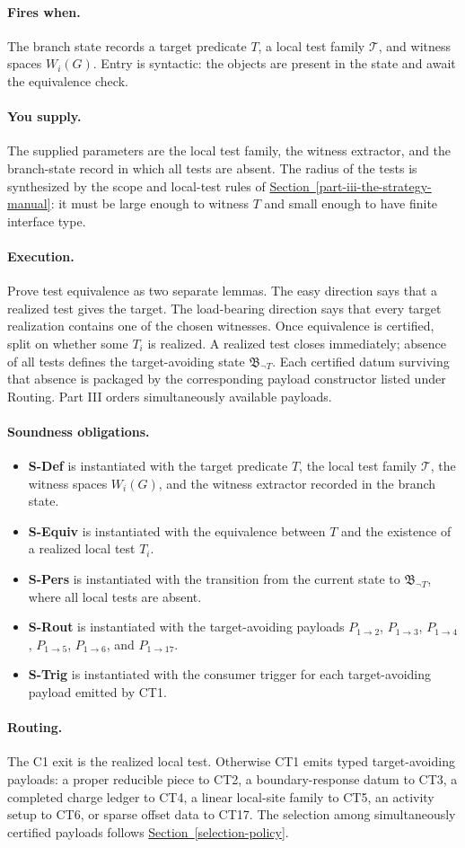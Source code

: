 \documentclass[
  11pt,
]{article}
\providecommand{\tightlist}{%
  \setlength{\itemsep}{0pt}\setlength{\parskip}{0pt}}
\theoremstyle{definition}
\newcommand{\secref}[1]{\hyperref[#1]{Section~\ref*{#1}}}
\newcommand{\ctpar}[1]{\paragraph{#1.}}
\begin{document}
\ctpar{Fires when}
The branch state records a target predicate \(T\), a local test family
\(\mathcal T\), and witness spaces \(W_i(G)\).  Entry is syntactic: the
objects are present in the state and await the equivalence check.

\ctpar{You supply}
The supplied parameters are the local test family, the witness extractor,
and the branch-state record in which all tests are absent.  The radius of
the tests is synthesized by the scope and local-test rules of \secref{part-iii-the-strategy-manual}:
it must be large enough to witness \(T\) and small enough to have finite
interface type.

\ctpar{Execution}
Prove test equivalence as two separate lemmas.  The easy direction says
that a realized test gives the target.  The load-bearing direction says
that every target realization contains one of the chosen witnesses.  Once
equivalence is certified, split on whether some \(T_i\) is realized.  A
realized test closes immediately; absence of all tests defines the
target-avoiding state \(\mathfrak B_{\neg T}\).  Each certified datum
surviving that absence is packaged by the corresponding payload
constructor listed under Routing.  Part III orders simultaneously
available payloads.

\ctpar{Soundness obligations}
\begin{itemize}
\tightlist
\item \textbf{S-Def} is instantiated with the target predicate \(T\), the local test family \(\mathcal T\), the witness spaces \(W_i(G)\), and the witness extractor recorded in the branch state.
\item \textbf{S-Equiv} is instantiated with the equivalence between \(T\) and the existence of a realized local test \(T_i\).
\item \textbf{S-Pers} is instantiated with the transition from the current state to \(\mathfrak B_{\neg T}\), where all local tests are absent.
\item \textbf{S-Rout} is instantiated with the target-avoiding payloads \(P_{1\to2}\), \(P_{1\to3}\), \(P_{1\to4}\), \(P_{1\to5}\), \(P_{1\to6}\), and \(P_{1\to17}\).
\item \textbf{S-Trig} is instantiated with the consumer trigger for each target-avoiding payload emitted by CT1.
\end{itemize}

\ctpar{Routing}
The C1 exit is the realized local test.  Otherwise CT1 emits typed
target-avoiding payloads: a proper reducible piece to CT2, a
boundary-response datum to CT3, a completed charge ledger to CT4, a
linear local-site family to CT5, an activity setup to CT6, or sparse
offset data to CT17.  The selection among simultaneously certified
payloads follows \secref{selection-policy}.
\end{document}
